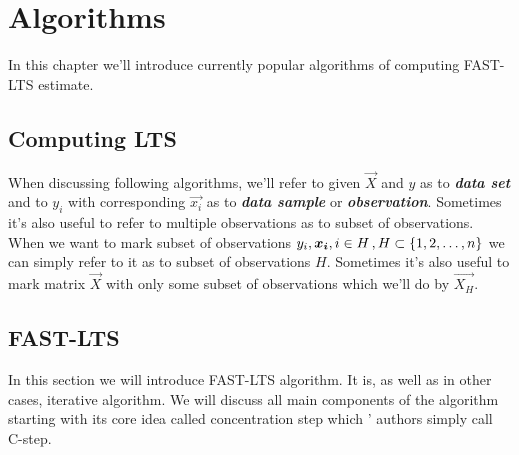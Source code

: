 \chapter{Algorithms}

In this chapter we'll introduce currently popular algorithms of computing FAST-LTS estimate.

\section{Computing LTS}

\begin{note}
	When discussing following algorithms, we'll refer to given $\vec{X}$ and $y$ as to \textbf{\textit{data set}} and to $y_i$ with corresponding $\vec{x_i}$ as to \textbf{\textit{data sample}} or \textbf{\textit{observation}}. Sometimes it's also useful to refer to multiple observations as to subset of observations. When we want to mark subset of observations  
	$y_i\\, \vec{x_i}\\, i \in H\,, H \subset \{{1,2,\ldots , n\}}$ we can simply refer to it as to subset of observations $H$. Sometimes it's also useful to mark matrix $\vec{X}$ with only some subset of observations which we'll do by $\vec{X_H}$.  
\end{note}


\section{FAST-LTS}
In this section we will introduce FAST-LTS algorithm\cite{rouss:2000}. 
It is, as well as in other cases, iterative algorithm. We will discuss all main components
of the algorithm starting with its core idea called concentration step which '
authors simply call C-step.

